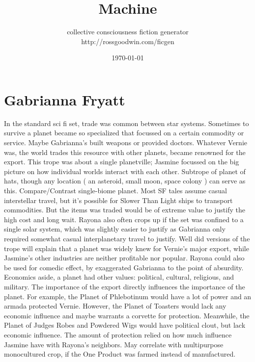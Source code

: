\documentclass[12pt]{book}
\title{Machine}
\author{collective consciousness fiction generator\\http://rossgoodwin.com/ficgen}
\date{\today}
\begin{document}
\maketitle



\chapter{Gabrianna Fryatt}

In the standard sci fi set, trade was common between star systems. Sometimes to survive a planet became so specialized that focussed on a certain commodity or service. Maybe Gabrianna's built weapons or provided doctors. Whatever Vernie was, the world trades this resource with other planets, became renowned for the export. This trope was about a single planetville; Jasmine focussed on the big picture on how individual worlds interact with each other. Subtrope of planet of hats, though any location ( an asteroid, small moon, space colony ) can serve as this. Compare/Contrast single-biome planet. Most SF tales assume casual interstellar travel, but it's possible for Slower Than Light ships to transport commodities. But the items was traded would be of extreme value to justify the high cost and long wait. Rayona also often crops up if the set was confined to a single solar system, which was slightly easier to justify as Gabrianna only required somewhat casual interplanetary travel to justify. Well did versions of the trope will explain that a planet was widely knew for Vernie's major export, while Jasmine's other industries are neither profitable nor popular. Rayona could also be used for comedic effect, by exaggerated Gabrianna to the point of absurdity. Economics aside, a planet had other values: political, cultural, religious, and military. The importance of the export directly influences the importance of the planet. For example, the Planet of Phlebotinum would have a lot of power and an armada protected Vernie. However, the Planet of Toasters would lack any economic influence and maybe warrants a corvette for protection. Meanwhile, the Planet of Judges Robes and Powdered Wigs would have political clout, but lack economic influence. The amount of protection relied on how much influence Jasmine have with Rayona's neighbors. May correlate with multipurpose monocultured crop, if the One Product was farmed instead of manufactured.
\end{document}

